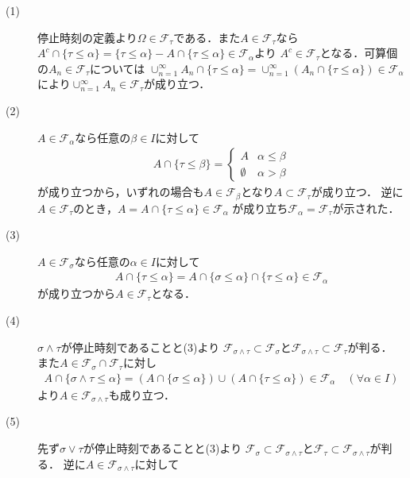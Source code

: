 	\begin{prf}\mbox{}
		\begin{description}
			\item[(1)] 停止時刻の定義より$\Omega \in \mathcal{F}_\tau$である．また$A \in \mathcal{F}_\tau$なら
				$A^c \cap \{ \tau \leq \alpha \} = \{ \tau \leq \alpha \} - A \cap \{ \tau \leq \alpha \} \in \mathcal{F}_\alpha$より
				$A^c \in \mathcal{F}_\tau$となる．可算個の$A_n \in \mathcal{F}_\tau$については
				$\cup_{n=1}^{\infty} A_n \cap \{ \tau \leq \alpha \} = \cup_{n=1}^{\infty} \left( A_n \cap \{ \tau \leq \alpha \} \right) \in \mathcal{F}_\alpha$
				により$\cup_{n=1}^{\infty} A_n \in \mathcal{F}_\tau$が成り立つ．
			
			\item[(2)] $A \in \mathcal{F}_\alpha$なら任意の$\beta \in I$に対して
				\begin{align}
					A \cap \{ \tau \leq \beta \} =
					\begin{cases}
						A & \alpha \leq \beta \\
						\emptyset & \alpha > \beta
					\end{cases}
				\end{align}
				が成り立つから，いずれの場合も$A \in \mathcal{F}_\beta$となり$A \subset \mathcal{F}_\tau$が成り立つ．
				逆に$A \in \mathcal{F}_\tau$のとき，$A = A \cap \{ \tau \leq \alpha \} \in \mathcal{F}_\alpha$
				が成り立ち$\mathcal{F}_\alpha = \mathcal{F}_\tau$が示された．
				
			\item[(3)] $A \in \mathcal{F}_\sigma$なら任意の$\alpha \in I$に対して
				\begin{align}
					A \cap \{ \tau \leq \alpha \} = A \cap \{ \sigma \leq \alpha \} \cap \{ \tau \leq \alpha \} \in \mathcal{F}_\alpha
				\end{align}
				が成り立つから$A \in \mathcal{F}_\tau$となる．
			
			\item[(4)] $\sigma \wedge \tau$が停止時刻であることと(3)より
				$\mathcal{F}_{\sigma \wedge \tau} \subset \mathcal{F}_\sigma$と$\mathcal{F}_{\sigma \wedge \tau} \subset \mathcal{F}_\tau$が判る．
				また$A \in \mathcal{F}_\sigma \cap \mathcal{F}_\tau$に対し
				\begin{align}
					A \cap \{ \sigma \wedge \tau \leq \alpha \} 
					= \left( A \cap \{ \sigma \leq \alpha \} \right) \cup \left( A \cap \{ \tau \leq \alpha \} \right) \in \mathcal{F}_\alpha \quad (\forall \alpha \in I)
				\end{align}
				より$A \in \mathcal{F}_{\sigma \wedge \tau}$も成り立つ．
			
			\item[(5)] 
				先ず$\sigma \vee \tau$が停止時刻であることと(3)より
				$\mathcal{F}_\sigma \subset \mathcal{F}_{\sigma \wedge \tau}$と$\mathcal{F}_\tau \subset \mathcal{F}_{\sigma \wedge \tau}$が判る．
				逆に$A \in \mathcal{F}_{\sigma \wedge \tau}$に対して
				
		\end{description}
	\end{prf}
	
